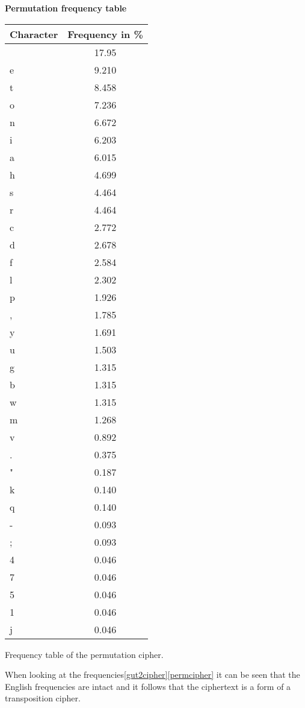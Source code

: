 \documentclass{uva-inf-bachelor-thesis}
\begin{document}
\begin{minipage}{0.5\textwidth}
\vspace{-16pt}
\centering
\textbf{Permutation frequency table}
\begin{tabular}{l|c}\toprule
Character & Frequency in \%     \\
\midrule
  & 17.95 \\
e & 9.210 \\
t & 8.458 \\
o & 7.236 \\
n & 6.672 \\
i & 6.203 \\
a & 6.015 \\
h & 4.699 \\
s & 4.464 \\
r & 4.464 \\
c & 2.772 \\
d & 2.678 \\
f & 2.584 \\
l & 2.302 \\
p & 1.926 \\
, & 1.785 \\
y & 1.691 \\
u & 1.503 \\
g & 1.315 \\
b & 1.315 \\
w & 1.315 \\
m & 1.268 \\
v & 0.892 \\
. & 0.375 \\
" & 0.187 \\
k & 0.140 \\
q & 0.140 \\
- & 0.093 \\
; & 0.093 \\
4 & 0.046 \\
7 & 0.046 \\
5 & 0.046 \\
1 & 0.046 \\
j & 0.046 \\ \bottomrule
\end{tabular}
\caption{Frequency table of the permutation cipher.}
\label{permcipher}
\end{minipage}

When looking at the frequencies\ref{gut2cipher}\ref{permcipher} it can be seen
that the English frequencies are intact and it follows that the ciphertext is
a form of a transposition cipher.\\
\end{document}
